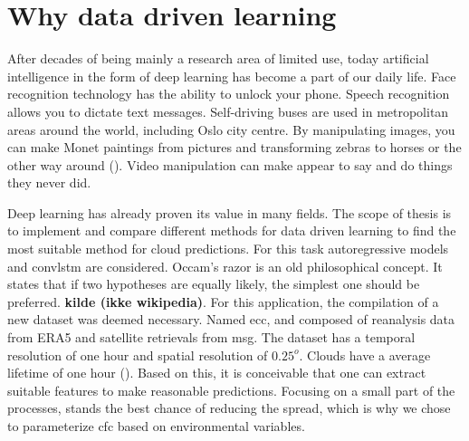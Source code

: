 
\section{Why data driven learning} \label{sec:intro_deep_learning}
After decades of being mainly a research area of limited use, today artificial intelligence in the form of deep learning has become a part of our daily life. Face recognition technology has the ability to unlock your phone. Speech recognition allows you to dictate text messages. Self-driving buses are used in metropolitan areas around the world, including Oslo city centre. By manipulating images, you can make Monet paintings from pictures and transforming zebras to horses or the other way around (\cite{zhu2017_cycleGAN_monet_zebra}). Video manipulation can make appear to say and do things they never did. 

Deep learning has already proven its value in many fields. The scope of thesis is to implement and compare different methods for data driven learning to find the most suitable method for cloud predictions. For this task autoregressive models and \acrfull{convlstm} are considered. 
Occam's razor is an old philosophical concept. It states that if two hypotheses are equally likely, the simplest one should be preferred. \textbf{kilde (ikke wikipedia)}. For this application, the compilation of a new dataset was deemed necessary. Named \acrfull{ecc}, and composed of reanalysis data from ERA5 and satellite retrievals from \acrfull{msg}. The dataset has a temporal resolution of one hour and spatial resolution of $0.25^o$. Clouds have a average lifetime of one hour (\cite{lohmann2016}). Based on this, it is conceivable that one can extract suitable features to make reasonable predictions. Focusing on a small part of the processes, stands the best chance of reducing the spread, which is why we chose to parameterize \acrfull{cfc} based on environmental variables.

